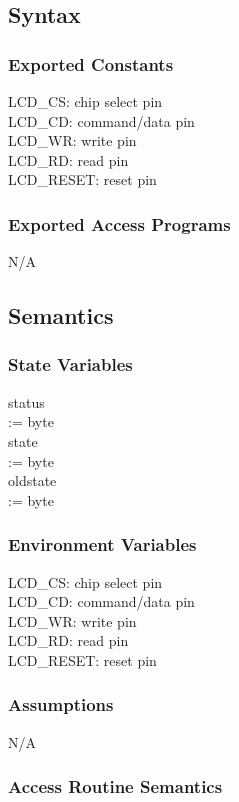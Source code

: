 \documentclass[12pt, titlepage]{article}
\begin{document}
\subsection{Syntax}

\subsubsection{Exported Constants}
LCD\_CS: chip select pin\\
LCD\_CD: command/data pin\\
LCD\_WR: write pin\\
LCD\_RD: read pin\\
LCD\_RESET: reset pin\\
\subsubsection{Exported Access Programs}

N/A

\subsection{Semantics}

\subsubsection{State Variables}

status\[\] := byte\\
state\[\] := byte\\
oldstate\[\] := byte\\

\subsubsection{Environment Variables}

LCD\_CS: chip select pin\\
LCD\_CD: command/data pin\\
LCD\_WR: write pin\\
LCD\_RD: read pin\\
LCD\_RESET: reset pin\\

\subsubsection{Assumptions}

N/A

\subsubsection{Access Routine Semantics}
\end{document}
